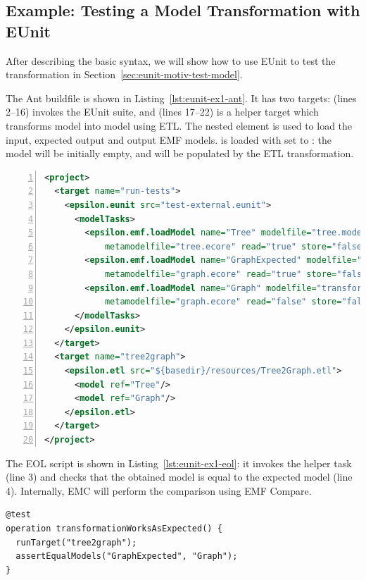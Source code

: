 \subsection{Example: Testing a Model Transformation with EUnit}
\label{sec:eunit-exampl-balanc-ant}

After describing the basic syntax, we will show how to use EUnit to test the transformation in Section~\ref{sec:eunit-motiv-test-model}.

The Ant buildfile is shown in Listing~\ref{lst:eunit-ex1-ant}. It has two targets:  (lines 2--16) invokes the EUnit suite, and  (lines 17--22) is a helper target which transforms model  into model  using ETL. The  nested element is used to load the input, expected output and output EMF models.  is loaded with  set to : the model will be initially empty, and will be populated by the ETL transformation.

\begin{lstlisting}[language=XML, numbers=left, caption=Ant buildfile for EUnit with \xmlelement{modelTasks} and a helper target, label=lst:eunit-ex1-ant,float]
<project>
  <target name="run-tests">
    <epsilon.eunit src="test-external.eunit">
      <modelTasks>
        <epsilon.emf.loadModel name="Tree" modelfile="tree.model"
            metamodelfile="tree.ecore" read="true" store="false"/>
        <epsilon.emf.loadModel name="GraphExpected" modelfile="graph.model"
            metamodelfile="graph.ecore" read="true" store="false"/>
        <epsilon.emf.loadModel name="Graph" modelfile="transformed.model"
            metamodelfile="graph.ecore" read="false" store="false"/>
      </modelTasks>
    </epsilon.eunit>
  </target>
  <target name="tree2graph">
    <epsilon.etl src="${basedir}/resources/Tree2Graph.etl">
      <model ref="Tree"/>
      <model ref="Graph"/>
    </epsilon.etl>
  </target>
</project>
\end{lstlisting}

The EOL script is shown in Listing~\ref{lst:eunit-ex1-eol}: it invokes the helper task (line 3) and checks that the obtained model is equal to the expected model (line 4). Internally, EMC will perform the comparison using EMF Compare.

\begin{lstlisting}[language=EOL, caption=EOL script using \eol{runTarget} to run ETL, label=lst:eunit-ex1-eol,float]
@test
operation transformationWorksAsExpected() {
  runTarget("tree2graph");
  assertEqualModels("GraphExpected", "Graph");
}
\end{lstlisting}

